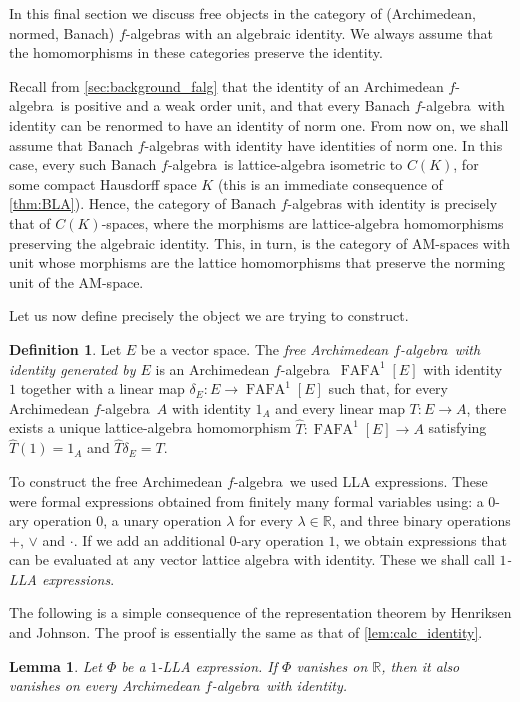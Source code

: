 \documentclass{memo-l}
\newtheorem{lem}[theorem]{Lemma}
\theoremstyle{definition}
\newtheorem{defn}[theorem]{Definition}
\theoremstyle{remark}
\numberwithin{section}{chapter}
\numberwithin{equation}{chapter}
\newcommand\R{\ensuremath{\mathbb{R}}}
\newcommand{\falg}{$f\!$-algebra}
\newcommand{\FAFAov}[1]{\operatorname{FAFA}^1[#1]}
\begin{document}
In this final section we discuss free objects in the category of
(Archimedean, normed, Banach) \falg s with an algebraic identity. We
always assume that the homomorphisms in these categories preserve
the identity.

Recall from \cref{sec:background_falg} that the identity of an
Archimedean \falg\ is positive and a weak order unit, and that every
Banach \falg\ with identity can be renormed to have an identity of
norm one. From now on, we shall assume that Banach \falg s with
identity have identities of norm one. In this case, every such
Banach \falg\ is lattice-algebra isometric to $C(K)$, for some
compact Hausdorff space $K$ (this is an immediate consequence of
\cref{thm:BLA}). Hence, the category of Banach \falg s
with identity is precisely that of $C(K)$-spaces, where the
morphisms are lattice-algebra homomorphisms preserving the
algebraic identity. This, in turn, is the category of AM-spaces with
unit whose morphisms are the lattice homomorphisms that preserve the
norming unit of the AM-space.

Let us now define precisely the object we are trying to construct.

\begin{defn}
    Let $E$ be a vector space. The \emph{free Archimedean \falg\
    with identity generated by $E$} is an Archimedean \falg\ $\FAFAov
    E$ with identity $1$ together with a
    linear map $\delta_E \colon E\to \FAFAov E$ such that, for every
    Archimedean
    \falg\ $A$ with identity $1_A$ and every linear map $T\colon E\to A$, there exists a
    unique lattice-algebra homomorphism $\hat{T}\colon \FAFAov E\to A$
    satisfying $\hat{T}(1)=1_A$ and $\hat{T}\delta _E=T$.
\end{defn}

To construct the free Archimedean \falg\ we used LLA expressions.
These were formal expressions obtained from finitely many formal
variables using: a 0-ary operation $0$, a unary operation $\lambda $
for every $\lambda \in \R$, and three binary operations $+$, $\vee $
and $\cdot $. If we add an additional 0-ary operation $1$, we obtain
expressions that can be evaluated at any vector lattice algebra with
identity. These we shall call \emph{$1$-LLA expressions}.

The following is a simple consequence of the representation theorem by
Henriksen and Johnson. The proof is essentially the same as that of
\cref{lem:calc_identity}.

\begin{lem}
    Let $\Phi $ be a $1$-LLA expression. If $\Phi $ vanishes on $\R$,
    then it also vanishes on every Archimedean \falg\ with identity.
\end{lem}
\end{document}
